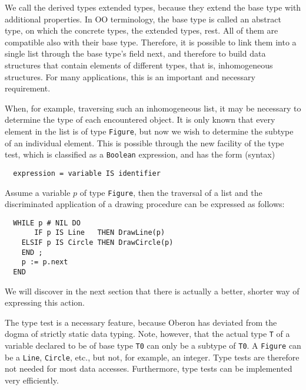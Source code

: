 We call the derived types extended types, because they extend the base type with additional properties.
In OO terminology, the base type is called an abstract type, on which the concrete types, the extended
types, rest. All of them are compatible also with their base type.  Therefore, it is possible to link
them into a single list through the base type’s field next, and therefore to build data structures that
contain elements of different types, that is, inhomogeneous structures.  For many applications, this is
an important and necessary requirement.

When, for example, traversing such an inhomogeneous list, it may be necessary to determine the type of
each encountered object. It is only known that every element in the list is of type \verb|Figure|, but
now we wish to determine the subtype of an individual element. This is possible through the new facility
of the type test, which is classified as a \verb|Boolean| expression, and has the form (syntax)
\begin{verbatim}
  expression = variable IS identifier
\end{verbatim}
Assume a variable $p$ of type \verb|Figure|, then the traversal of a list and the discriminated application
of a drawing procedure can be expressed as follows:
\begin{verbatim}
  WHILE p # NIL DO
       IF p IS Line   THEN DrawLine(p)
    ELSIF p IS Circle THEN DrawCircle(p)
    END ;
    p := p.next
  END
\end{verbatim}
We will discover in the next section that there is actually a better, shorter way of expressing this
action.

The type test is a necessary feature, because Oberon has deviated from the dogma of strictly static
data typing. Note, however, that the actual type \verb|T| of a variable declared to be of base type
\verb|T0| can only be a subtype of \verb|T0|. A \verb|Figure| can be a \verb|Line|, \verb|Circle|,
etc., but not, for example, an integer. Type tests are therefore not needed for most data accesses.
Furthermore, type tests can be implemented very efficiently.

